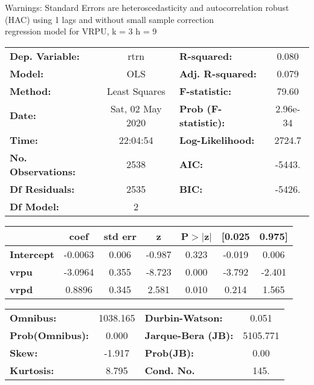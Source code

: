 Warnings: \newline
 [1] Standard Errors are heteroscedasticity and autocorrelation robust (HAC) using 1 lags and without small sample correction\\ 

regression model for VRPU, k = 3 h = 9\begin{center}
\begin{tabular}{lclc}
\toprule
\textbf{Dep. Variable:}    &       rtrn       & \textbf{  R-squared:         } &     0.080   \\
\textbf{Model:}            &       OLS        & \textbf{  Adj. R-squared:    } &     0.079   \\
\textbf{Method:}           &  Least Squares   & \textbf{  F-statistic:       } &     79.60   \\
\textbf{Date:}             & Sat, 02 May 2020 & \textbf{  Prob (F-statistic):} &  2.96e-34   \\
\textbf{Time:}             &     22:04:54     & \textbf{  Log-Likelihood:    } &    2724.7   \\
\textbf{No. Observations:} &        2538      & \textbf{  AIC:               } &    -5443.   \\
\textbf{Df Residuals:}     &        2535      & \textbf{  BIC:               } &    -5426.   \\
\textbf{Df Model:}         &           2      & \textbf{                     } &             \\
\bottomrule
\end{tabular}
\begin{tabular}{lcccccc}
                   & \textbf{coef} & \textbf{std err} & \textbf{z} & \textbf{P$> |$z$|$} & \textbf{[0.025} & \textbf{0.975]}  \\
\midrule
\textbf{Intercept} &      -0.0063  &        0.006     &    -0.987  &         0.323        &       -0.019    &        0.006     \\
\textbf{vrpu}      &      -3.0964  &        0.355     &    -8.723  &         0.000        &       -3.792    &       -2.401     \\
\textbf{vrpd}      &       0.8896  &        0.345     &     2.581  &         0.010        &        0.214    &        1.565     \\
\bottomrule
\end{tabular}
\begin{tabular}{lclc}
\textbf{Omnibus:}       & 1038.165 & \textbf{  Durbin-Watson:     } &    0.051  \\
\textbf{Prob(Omnibus):} &   0.000  & \textbf{  Jarque-Bera (JB):  } & 5105.771  \\
\textbf{Skew:}          &  -1.917  & \textbf{  Prob(JB):          } &     0.00  \\
\textbf{Kurtosis:}      &   8.795  & \textbf{  Cond. No.          } &     145.  \\
\bottomrule
\end{tabular}
\end{center}

